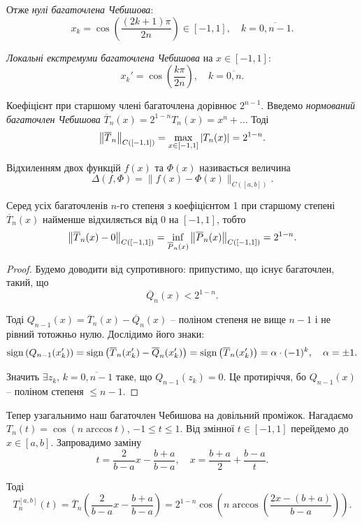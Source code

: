 Отже \textit{нулі багаточлена Чебишова}: \[ x_k = \cos \left( \dfrac{(2k+1)\pi}{2n} \right) \in [-1,1], \quad k=\overline{0,n-1}. \]

\textit{Локальні екстремуми багаточлена Чебишова} на $x\in[-1,1]$:
\[ x_k' = \cos \left( \dfrac{k\pi}{2n} \right), \quad k=\overline{0,n}.\]

Коефіцієнт при старшому члені багаточлена дорівнює $2^{n-1}$. Введемо \textit{нормований багаточлен Чебишова} $\overline{T}_n(x) = 2^{1-n} T_n(x) = x^n + \ldots$ Тоді
\[ \left\|\overline{T}_n\right\|_{C([-1,1])} = \displaystyle\max\limits_{x\in[-1,1]} |T_n(x)| = 2^{1-n}. \] 

Відхиленням двох функцій $f(x)$ та $\Phi(x)$ називається величина 
\[ \Delta (f, \Phi) = \| f(x) - \Phi(x)\|_{C([a,b])}. \]

\begin{theorem}[Чебишова]
    Серед усіх багаточленів $n$-го степеня з коефіцієнтом 1 при старшому степені $\overline{T}_n(x)$ найменше відхиляється від 0 на $[-1,1]$, тобто 
    \[ \left\|\overline{T}_n(x) - 0\right\|_{C([-1,1])} = \displaystyle\inf\limits_{\overline{P}_n(x)} \left\|\overline{P}_n(x)\right\|_{C([-1,1])} = 2^{1-n}. \]
\end{theorem}

\begin{proof}
    Будемо доводити від супротивного: припустимо, що існує багаточлен, такий, що 
    \[ \overline{Q}_n(x) < 2^{1-n}.\]

    Тоді $Q_{n-1}(x) = \overline{T}_n(x) - \overline{Q}_n(x)$ -- поліном степеня не вище $n-1$ і не рівний тотожньо нулю. Дослідимо його знаки:
    \[ \operatorname{sign}\left(Q_{n-1}(x_k')\right)=\operatorname{sign}\left(\overline{T}_n(x_k')-\overline{Q}_n(x_k')\right)=\operatorname{sign}\left(\overline{T}_n(x_k')\right) = \alpha\cdot(-1)^k, \quad \alpha = \pm 1. \]

    Значить $\exists z_k$, $k=\overline{0,n-1}$ таке, що $Q_{n-1}(z_k)=0$. Це протиріччя, бо $Q_{n-1}(x)$ -- поліном степеня $\le n - 1$.
\end{proof}

Тепер узагальнимо наш багаточлен Чебишова на довільний проміжок. Нагадаємо $T_n(t) = \cos(n \arccos t)$, $-1 \le t \le 1$. Від змінної $t \in [-1, 1]$ перейдемо до $x \in [a,b]$. Запровадимо заміну
\[t = \frac{2}{b-a}x - \frac{b+a}{b-a}, \quad x=\frac{b+a}{2}+\frac{b-a}t.\] 

Тоді 
\[ T_n^{[a,b]}(t)=\overline{T}_n\left(\dfrac{2}{b-a}x-\dfrac{b+a}{b-a}\right)=2^{1-n}\cos\left(n\arccos\left(\dfrac{2x-(b+a)}{b-a}\right)\right).\]

